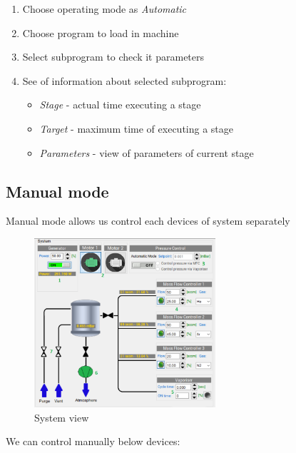 \begin{enumerate}
	\item Choose operating mode as \textit{Automatic}
	\item Choose program to load in machine
	\item Select subprogram to check  it parameters
	\item See of information about selected subprogram:
	\begin{itemize}
		\item \textit{Stage} - actual time executing a stage
		\item\textit{Target} - maximum  time of executing a stage
		\item \textit{Parameters} - view of parameters of current stage
	\end{itemize}
\end{enumerate}

\subsection{Manual mode}

Manual mode allows us control each devices of system separately

	\begin{figure}[!h] 
	\centering \includegraphics[width=0.6\textwidth]{Graphic/MainScreen/ManualMode.png}	
	\caption{System view}
	\label{system_view}
	\end{figure}
	\FloatBarrier

We can control manually below devices:

